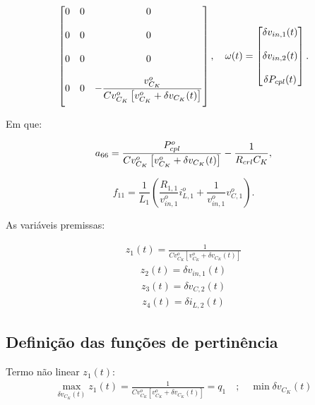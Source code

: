 \begin{gather}
\begin{bmatrix}
      0 & 0                   & 0
                            \\[12pt]
      0 & 0                   & 0
                            \\[12pt]
      0 & 0                   & 0
                            \\[12pt]
      0 & 0                   & - \displaystyle \frac{v_{C_K}^o}{Cv_{C_K}^o \left[ v_{C_K}^o + \delta v_{C_K}(t) \right]}
                            \\[12pt]
  \end{bmatrix}, \quad
  \omega(t) = \begin{bmatrix}
    \delta v_{in,1}(t) \\[12pt] \delta v_{in,2}(t) \\[12pt] \delta P_{cpl}(t)
  \end{bmatrix}.
\end{gather}

Em que:

\begin{equation*}
    a_{66} = \displaystyle \frac{P_{cpl}^o}{Cv_{C_K}^o \left[ v_{C_K}^o + \delta v_{C_K}(t) \right]} - \frac{1}{R_{crl} C_K},
\end{equation*} 

\begin{equation*}
    f_{11} = \frac{1}{L_1} \left( \frac{R_{1,1}}{v_{in,1}^o}i_{L,1}^o + \frac{1}{v_{in,1}^o}v_{C,1}^o \right).
\end{equation*}


As variáveis premissas:

\begin{gather*}
    z_1(t) = \frac{1}{Cv_{C_K}^o \left[ v_{C_K}^o + \delta v_{C_K}(t) \right]}
\end{gather*}
\begin{gather*}
    z_2(t) = \delta v_{in,1}(t)
\end{gather*}
\begin{gather*}
    z_3(t) = \delta v_{C,2}(t)
\end{gather*}
\begin{gather}
    z_4(t) = \delta i_{L,2}(t)
\end{gather}

\subsection*{Definição das funções de pertinência}

Termo não linear $z_1(t)$:
\begin{gather*}
    \max_{\delta v_{C_K}(t)} z_1(t) = \frac{1}{Cv_{C_K}^o \left[ v_{C_K}^o + \delta v_{C_K}(t) \right]} = q_1 \quad ; \quad \min \delta v_{C_K}(t)
\end{gather*}

